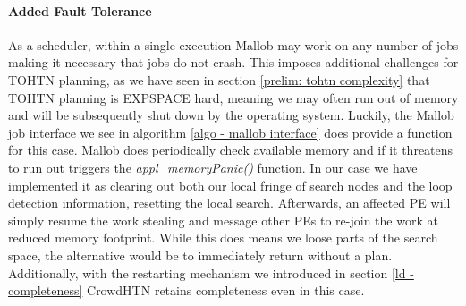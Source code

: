 \paragraph{Added Fault Tolerance}
As a scheduler, within a single execution Mallob may work on any number of jobs making it necessary that jobs do not crash. This imposes additional challenges for TOHTN planning, as we have seen in section \ref{prelim: tohtn complexity} that TOHTN planning is EXPSPACE hard, meaning we may often run out of memory and will be subsequently shut down by the operating system. Luckily, the Mallob job interface we see in algorithm \ref{algo - mallob interface} does provide a function for this case. Mallob does periodically check available memory and if it threatens to run out triggers the \textit{appl\_memoryPanic()} function. In our case we have implemented it as clearing out both our local fringe of search nodes and the loop detection information, resetting the local search. Afterwards, an affected PE will simply resume the work stealing and message other PEs to re-join the work at reduced memory footprint. While this does means we loose parts of the search space, the alternative would be to immediately return without a plan. Additionally, with the restarting mechanism we introduced in section \ref{ld - completeness} CrowdHTN retains completeness even in this case.

